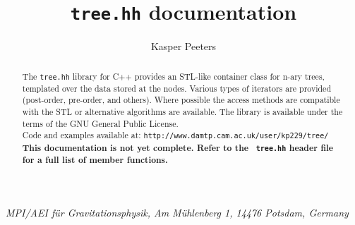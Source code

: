 \documentclass[11pt]{kasper}
\begin{document}
\title{{\tt tree.hh} documentation}
\author{Kasper Peeters}
\address{1}{{\it MPI/AEI f\"ur Gravitationsphysik, Am M\"uhlenberg 1, 14476
Potsdam, Germany}}
\maketitle
\begin{abstract}
The {\tt tree.hh} library for C++ provides an STL-like container class
for n-ary trees, templated over the data stored at the nodes.  Various
types of iterators are provided (post-order, pre-order, and
others). Where possible the access methods are compatible with the STL
or alternative algorithms are available. The library is available
under the terms of the GNU General Public License.\\[3ex]
Code and examples available at: {\tt http://www.damtp.cam.ac.uk/user/kp229/tree/}\\[3ex]
{\bf This documentation is not yet complete. Refer to the {\tt
tree.hh} header file for a full list of member functions.}
\end{abstract}
\maketoc
\end{document}
